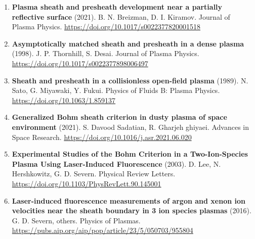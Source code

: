 \documentclass[11pt,a4paper]{article}
\begin{document}
\begin{enumerate}[leftmargin=1.4em]
\item \textbf{Plasma sheath and presheath development near a partially reflective surface} (2021). B. N. Breizman, D. I. Kiramov. Journal of Plasma Physics. \url{https://doi.org/10.1017/s0022377820001518}
\item \textbf{Asymptotically matched sheath and presheath in a dense plasma} (1998). J. P. Thornhill, S. Desai. Journal of Plasma Physics. \url{https://doi.org/10.1017/s0022377898006497}
\item \textbf{Sheath and presheath in a collisionless open-field plasma} (1989). N. Sato, G. Miyawaki, Y. Fukui. Physics of Fluids B: Plasma Physics. \url{https://doi.org/10.1063/1.859137}
\item \textbf{Generalized Bohm sheath criterion in dusty plasma of space environment} (2021). S. Davood Sadatian, R. Gharjeh ghiyaei. Advances in Space Research. \url{https://doi.org/10.1016/j.asr.2021.06.020}
\item \textbf{Experimental Studies of the Bohm Criterion in a Two-Ion-Species Plasma Using Laser-Induced Fluorescence} (2003). D. Lee, N. Hershkowitz, G. D. Severn. Physical Review Letters. \url{https://doi.org/10.1103/PhysRevLett.90.145001}
\item \textbf{Laser-induced fluorescence measurements of argon and xenon ion velocities near the sheath boundary in 3 ion species plasmas} (2016). G. D. Severn, others. Physics of Plasmas. \url{https://pubs.aip.org/aip/pop/article/23/5/050703/955804}
\end{enumerate}
\end{document}

